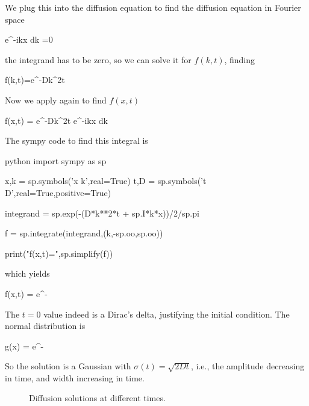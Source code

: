 We plug  this into the diffusion equation to find
the diffusion equation in Fourier space

\beq
\int {}e^{-ikx} dk =0
\eeq

\noindent the integrand has to be zero, so we can solve it for
$f(k,t)$, finding 

\beq
f(k,t)=e^{-Dk^2t}
\eeq

Now we apply  again to find $f(x,t)$

\beq
f(x,t) = \int e^{-Dk^2t} e^{-ikx} dk 
\eeq

The sympy code to find this integral is

\begin{mintedbox}{python}
import sympy as sp

x,k = sp.symbols('x k',real=True)
t,D = sp.symbols('t D',real=True,positive=True)

integrand = sp.exp(-(D*k**2*t + sp.I*k*x))/2/sp.pi

f = sp.integrate(integrand,(k,-sp.oo,sp.oo))

print("f(x,t)=",sp.simplify(f))
\end{mintedbox} 

\noindent which yields

\beq
f(x,t) = e^{-}
\eeq

The $t=0$ value indeed is a Dirac's delta, justifying the
initial condition. The normal distribution is 

\beq
g(x) =  e^{-}
\eeq

So the solution is a Gaussian with $\sigma(t)=\sqrt{2Dt}$, i.e., the amplitude
decreasing in time, and width increasing in time.  

\begin{figure}
  \begin{center}
  \end{center}
  \caption[]{Diffusion solutions at different times.}
  \label{fig:diffusion}
\end{figure}

